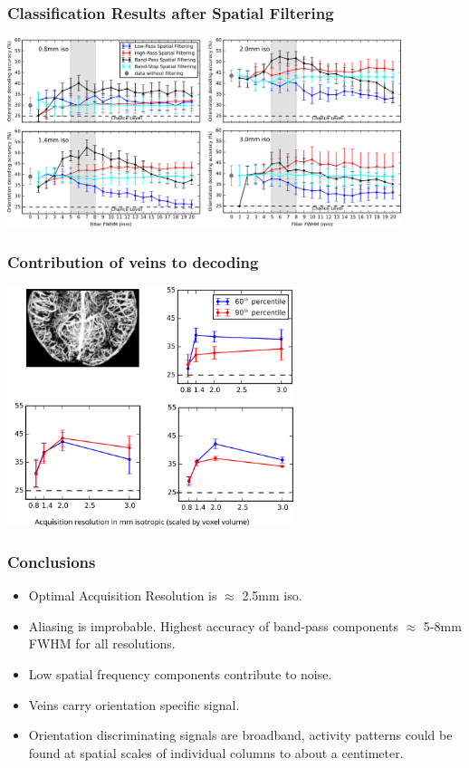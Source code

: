 \documentclass{beamer}
\begin{document}
  \begin{frame}
    \frametitle{Classification Results after Spatial Filtering}
        \begin{center}
            \includegraphics[height=5.5cm]{../pictures/spatial_smoothing_multires}
        \end{center}
    \end{frame} 


  \begin{frame}
    \frametitle{Contribution of veins to decoding}
        \begin{center}
            \includegraphics[height=7cm]{../pictures/veins}
        \end{center}
    \end{frame} 

  \begin{frame}
    \frametitle{Conclusions}
        \begin{center}
        \begin{itemize}
         \item Optimal Acquisition Resolution is $\approx$ 2.5mm iso.
         \item Aliasing is improbable. Highest accuracy of band-pass 
         components $\approx$ 5-8mm FWHM for all resolutions.
         \item Low spatial frequency components contribute to noise.
         \item Veins carry orientation specific signal.
         \item Orientation discriminating signals are broadband, activity patterns 
         could be found at spatial scales of individual columns to about a centimeter. 
        \end{itemize}  
        \end{center}
    \end{frame} 
\end{document}

